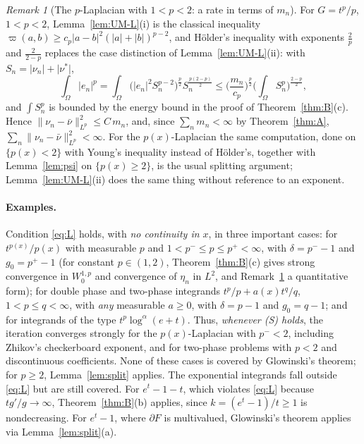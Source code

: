 \documentclass[11pt]{amsart}
\theoremstyle{definition}
\theoremstyle{remark}
\newtheorem{remark}[theorem]{Remark}
\numberwithin{equation}{section}
\newcommand{\abs}[1]{\lvert #1\rvert}
\newcommand{\norm}[1]{\lVert #1\rVert}
\begin{document}
\begin{remark}[The $p$-Laplacian with $1<p<2$: a rate in terms of $m_n$]\label{rem:pLap-rate}
For $G=t^p/p$, $1<p<2$, Lemma~\ref{lem:UM-L}(i) is the classical inequality $\varpi(a,b)\ge c_p\abs{a-b}^2(\abs a+\abs b)^{p-2}$, and H\"older's inequality with exponents $\frac2p$ and $\frac2{2-p}$ replaces the case distinction of Lemma~\ref{lem:UM-L}(ii): with $S_n=\abs{\nu_n}+\abs{\nu^*}$,
\[
\int_\Omega\abs{e_n}^p=\int_\Omega\big(\abs{e_n}^2S_n^{p-2}\big)^{\frac p2}S_n^{\frac{p(2-p)}2}\le\Big(\frac{m_n}{c_p}\Big)^{\frac p2}\Big(\int_\Omega S_n^p\Big)^{\frac{2-p}2},
\]
and $\int S_n^p$ is bounded by the energy bound in the proof of Theorem~\ref{thm:B}(c). Hence $\norm{\nu_n-\bar\nu}_{L^p}^2\le C\,m_n$, and, since $\sum_nm_n<\infty$ by Theorem~\ref{thm:A}, $\sum_n\norm{\nu_n-\bar\nu}_{L^p}^2<\infty$. For the $p(x)$-Laplacian the same computation, done on $\{p(x)<2\}$ with Young's inequality instead of H\"older's, together with Lemma~\ref{lem:psi} on $\{p(x)\ge2\}$, is the usual splitting argument; Lemma~\ref{lem:UM-L}(ii) does the same thing without reference to an exponent.
\end{remark}

\paragraph{Examples.} Condition \eqref{eq:L} holds, with \emph{no continuity in $x$}, in three important cases: for $t^{p(x)}/p(x)$ with measurable $p$ and $1<p^-\le p\le p^+<\infty$, with $\delta=p^--1$ and $g_0=p^+-1$ (for constant $p\in(1,2)$, Theorem~\ref{thm:B}(c) gives strong convergence in $W^{1,p}_0$ and convergence of $\eta_n$ in $L^2$, and Remark~\ref{rem:pLap-rate} a quantitative form); for double phase and two-phase integrands $t^p/p+a(x)t^q/q$, $1<p\le q<\infty$, with \emph{any} measurable $a\ge0$, with $\delta=p-1$ and $g_0=q-1$; and for integrands of the type $t^p\log^\alpha(e+t)$. Thus, \emph{whenever (S) holds}, the iteration converges strongly for the $p(x)$-Laplacian with $p^-<2$, including Zhikov's checkerboard exponent, and for two-phase problems with $p<2$ and discontinuous coefficients. None of these cases is covered by Glowinski's theorem; for $p\ge2$, Lemma~\ref{lem:split} applies. The exponential integrands fall outside \eqref{eq:L} but are still covered. For $e^t-1-t$, which violates \eqref{eq:L} because $tg'/g\to\infty$, Theorem~\ref{thm:B}(b) applies, since $k=(e^t-1)/t\ge1$ is nondecreasing. For $e^t-1$, where $\partial F$ is multivalued, Glowinski's theorem applies via Lemma~\ref{lem:split}(a).
\end{document}
